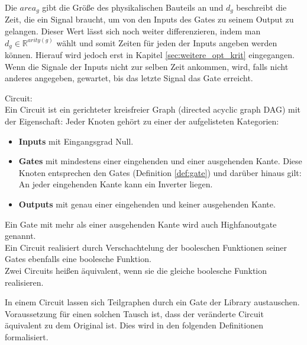\documentclass[11pt, a4paper, german]{article}
\begin{document}
Die $area_g$ gibt die Größe des physikalischen Bauteils an und $d_g$ beschreibt die Zeit, die ein Signal braucht, um von den Inputs des Gates zu seinem Output zu gelangen. Dieser Wert lässt sich noch weiter differenzieren, indem man $d_g \in \mathbb{R}^{arity(g)}$ wählt und somit Zeiten für jeden der Inputs angeben werden können. Hierauf wird jedoch erst in Kapitel \ref{sec:weitere_opt_krit} eingegangen. \\
Wenn die Signale der Inputs nicht zur selben Zeit ankommen, wird, falls nicht anderes angegeben, gewartet, bis das letzte Signal das Gate erreicht.

\begin{definition}{Circuit:}\\
Ein Circuit ist ein gerichteter kreisfreier Graph (directed acyclic graph DAG) mit der Eigenschaft: Jeder Knoten gehört zu einer der aufgelisteten Kategorien: 
\begin{itemize}
\item {\bf Inputs }mit Eingangsgrad Null.
\item{\bf Gates} mit mindestens einer eingehenden und einer ausgehenden Kante.
Diese Knoten entsprechen den Gates (Definition \ref{def:gate}) und darüber hinaus gilt: An jeder eingehenden Kante kann ein Inverter liegen.
\item{\bf Outputs} mit genau einer eingehenden und keiner ausgehenden Kante.
\end{itemize}
Ein Gate mit mehr als einer ausgehenden Kante wird auch Highfanoutgate genannt.\\
Ein Circuit realisiert durch Verschachtelung der booleschen Funktionen seiner Gates ebenfalls eine boolesche Funktion. \\
Zwei Circuits heißen äquivalent, wenn sie die gleiche boolesche Funktion realisieren.
\end{definition}

In einem Circuit lassen sich Teilgraphen durch ein Gate der Library austauschen. Voraussetzung für einen solchen Tausch ist, dass der veränderte Circuit äquivalent zu dem Original ist. Dies wird in den folgenden Definitionen formalisiert. 
\end{document}
